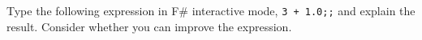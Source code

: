 Type the following expression in F\# interactive mode, \lstinline{3 + 1.0;;} and explain the result. Consider whether you can improve the expression.